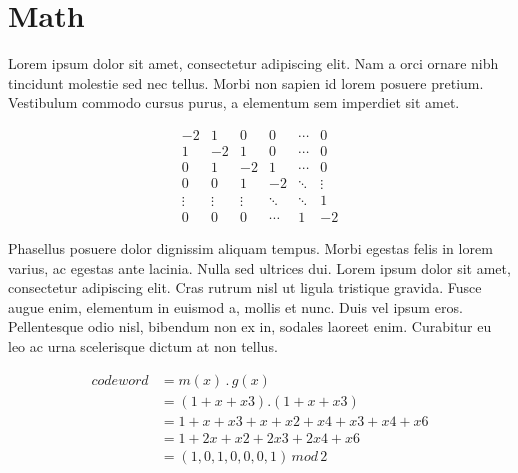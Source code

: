 \chapter{Math}

Lorem ipsum dolor sit amet, consectetur adipiscing elit. Nam a orci ornare nibh tincidunt molestie sed nec tellus. Morbi non sapien id lorem posuere pretium. Vestibulum commodo cursus purus, a elementum sem imperdiet sit amet.

\[
	\begin{matrix}
		-2 & 1 & 0 & 0 & \cdots & 0  \\
		1 & -2 & 1 & 0 & \cdots & 0  \\
		0 & 1 & -2 & 1 & \cdots & 0  \\
		0 & 0 & 1 & -2 & \ddots & \vdots \\
		\vdots & \vdots & \vdots & \ddots & \ddots & 1  \\
		0 & 0 & 0 & \cdots & 1 & -2
	\end{matrix}
\]

Phasellus posuere dolor dignissim aliquam tempus. Morbi egestas felis in lorem varius, ac egestas ante lacinia. Nulla sed ultrices dui. Lorem ipsum dolor sit amet, consectetur adipiscing elit. Cras rutrum nisl ut ligula tristique gravida. Fusce augue enim, elementum in euismod a, mollis et nunc. Duis vel ipsum eros. Pellentesque odio nisl, bibendum non ex in, sodales laoreet enim. Curabitur eu leo ac urna scelerisque dictum at non tellus.

\begin{align*}
		codeword		& = m(x) \, . \, g(x) \\
							& = (1 + x + x3) . (1 + x + x3)\\
							& = 1 + x + x3 + x + x2 + x4 + x3 + x4 + x6\\
							& = 1 + 2x + x2 + 2x3 + 2x4 + x6\\
							& = (1, 0, 1, 0, 0, 0, 1) \, mod \, 2
\end{align*}
